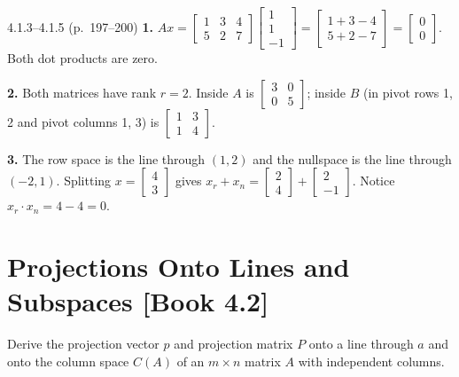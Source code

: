 \documentclass[11pt,a4paper,openany,oneside]{book}
\def\vect#1{#1}%
\def\mathbf#1{#1}%
\def\bk#1{ [Book #1]}%
\newcommand{\vect}[1]{\mathbf{#1}}
\numberwithin{equation}{chapter}
\newcommand{\bk}[1]{\texorpdfstring{\enspace{\normalfont\small\color{slate}[Book #1]}}{ [Book #1]}}
\begin{document}
\vfill
\begin{pageend_sol}{4.1.3--4.1.5 (p.\ 197--200)}
\textbf{1.} $A\vect{x} = \begin{bmatrix}1 & 3 & 4\\5 & 2 & 7\end{bmatrix}\begin{bmatrix}1\\1\\-1\end{bmatrix} = \begin{bmatrix}1+3-4\\5+2-7\end{bmatrix} = \begin{bmatrix}0\\0\end{bmatrix}$. Both dot products are zero.

\textbf{2.} Both matrices have rank $r=2$. Inside $A$ is $\begin{bmatrix}3&0\\0&5\end{bmatrix}$; inside $B$ (in pivot rows 1, 2 and pivot columns 1, 3) is $\begin{bmatrix}1&3\\1&4\end{bmatrix}$.

\textbf{3.} The row space is the line through $(1,2)$ and the nullspace is the line through $(-2,1)$. Splitting $\vect{x} = \begin{bmatrix}4\\3\end{bmatrix}$ gives $\vect{x}_r + \vect{x}_n = \begin{bmatrix}2\\4\end{bmatrix} + \begin{bmatrix}2\\-1\end{bmatrix}$. Notice $\vect{x}_r\cdot\vect{x}_n = 4 - 4 = 0$.
\end{pageend_sol}
\clearpage

\section{Projections Onto Lines and Subspaces\bk{4.2}}

\begin{goal}
Derive the projection vector $\vect{p}$ and projection matrix $P$ onto a line through $\vect{a}$ and onto the column space $C(A)$ of an $m \times n$ matrix $A$ with independent columns.
\end{goal}
\end{document}

